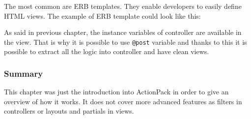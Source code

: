       The most common are ERB templates. They enable developers to easily define
      HTML views. The example of ERB template could look like this:
      
      
      
      As said in previous chapter, the instance variables of controller are available in the view.
      That is why it is possible to use \texttt{@post} variable and thanks to this it is possible to 
      extract all the logic into controller and have clean views.
      
      \subsubsection{Summary}
      This chapter was just the introduction into ActionPack in order to give an overview of how 
      it works. It does not cover more advanced features as filters in controllers or layouts
      and partials in views.
